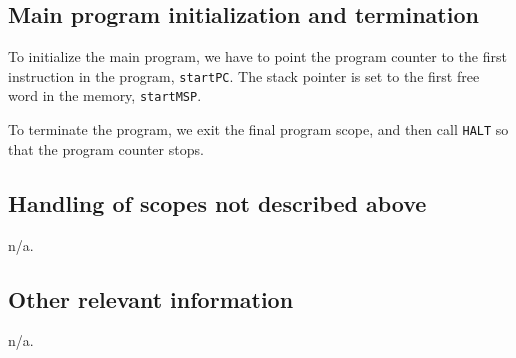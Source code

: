 \documentclass[11pt]{article}
\begin{document}
\subsection{Main program initialization and termination}

To initialize the main program, we have to point the program counter to the first instruction in the program, \texttt{startPC}. The stack pointer is set to the first free word in the memory, \texttt{startMSP}.

To terminate the program, we exit the final program scope, and then call \texttt{HALT} so that the program counter stops.

\subsection{Handling of scopes not described above}

n/a.

\subsection{Other relevant information}

n/a.
\end{document}
